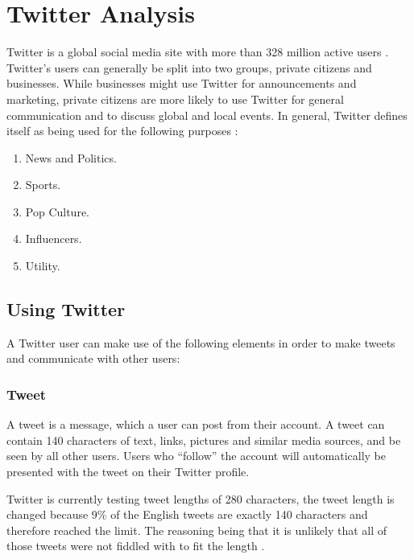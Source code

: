 \section{Twitter Analysis}\label{sec:twitter-analysis}
Twitter is a global social media site with more than 328 million active users
\citep{aboutTwitter}. Twitter's users
can generally be split into two groups, private citizens and businesses. While businesses might use Twitter for
announcements and marketing, private citizens are more likely to use Twitter for
general communication and to discuss global and local events. In general,
Twitter defines itself as being used for the following purposes
\citep{StartingTwitter}:

\begin{enumerate}    
  \item News and Politics.
  \item Sports.
  \item Pop Culture. 
  \item Influencers.
  \item Utility.
\end{enumerate} %

\subsection{Using Twitter}
A Twitter user can make use of the following elements \citep{StartingTwitter}
in order to make tweets and communicate with other users:

\subsubsection{Tweet}
A tweet is a message, which a user can post from their account. A tweet can
contain 140 characters \citep{StartingTwitter2}  of text, links, pictures and similar media sources, and be
seen by all other users. Users who ``follow'' the account will automatically be presented with the tweet on their Twitter profile.

Twitter is currently testing tweet lengths of 280 characters, the tweet length
is changed because 9\% of the English tweets are exactly 140 characters and
therefore reached the limit. The reasoning being that it is unlikely that all of
those tweets were not fiddled with to fit the length \cite{TweetL} .

